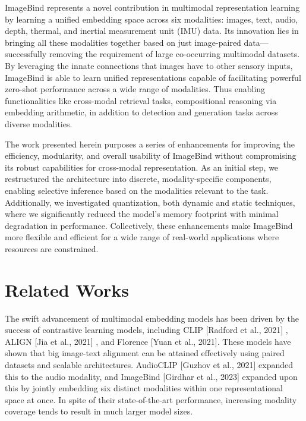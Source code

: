 \documentclass[runningheads]{IEEEtran}
\begin{document}
ImageBind \cite{girdhar2023imagebindembeddingspacebind} represents a novel contribution in multimodal representation learning by learning a unified embedding space across six modalities: images, text, audio, depth, thermal, and inertial measurement unit (IMU) data. Its innovation lies in bringing all these modalities together based on just image-paired data—successfully removing the requirement of large co-occurring multimodal datasets. By leveraging the innate connections that images have to other sensory inputs, ImageBind is able to learn unified representations capable of facilitating powerful zero-shot performance across a wide range of modalities. Thus enabling functionalities like cross-modal retrieval tasks, compositional reasoning via embedding arithmetic, in addition to detection and generation tasks across diverse modalities.

The work presented herein purposes a series of enhancements for improving the efficiency, modularity, and overall usability of ImageBind without compromising its robust capabilities for cross-modal representation. As an initial step, we restructured the architecture into discrete, modality-specific components, enabling selective inference based on the modalities relevant to the task. Additionally, we investigated quantization, both dynamic and static techniques, where we significantly reduced the model’s memory footprint with minimal degradation in performance. Collectively, these enhancements make ImageBind more flexible and efficient for a wide range of real-world applications where resources are constrained.

\section{Related Works}
The swift advancement of multimodal embedding models has been driven by the success of contrastive learning models, including CLIP [Radford et al., 2021] \cite{radford2021learningtransferablevisualmodels}, ALIGN [Jia et al., 2021] \cite{jia2021scalingvisualvisionlanguagerepresentation}, and Florence [Yuan et al., 2021]\cite{yuan2021florencenewfoundationmodel}. These models have shown that big image-text alignment can be attained effectively using paired datasets and scalable architectures. AudioCLIP [Guzhov et al., 2021]\cite{guzhov2021audioclipextendingclipimage} expanded this to the audio modality, and ImageBind [Girdhar et al., 2023]\cite{girdhar2023imagebindembeddingspacebind} expanded upon this by jointly embedding six distinct modalities within one representational space at once. In spite of their state-of-the-art performance, increasing modality coverage tends to result in much larger model sizes.
\end{document}
